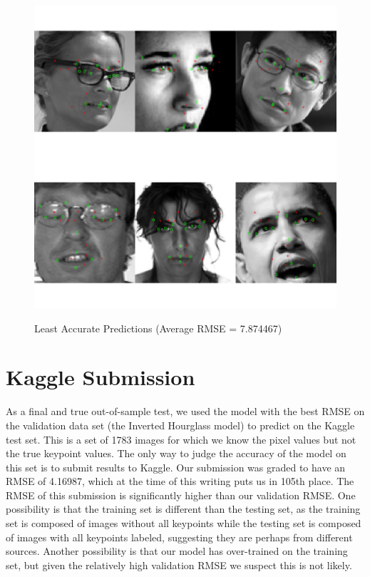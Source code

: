\documentclass[journal]{IEEEtran}
\begin{document}
\begin{figure}[!htb]
  \centering
  \caption{Least Accurate Predictions (Average RMSE = 7.874467)}
  \includegraphics[scale=.49]{worst_faces.pdf}
  \label{fig:worst_faces}
\end{figure}

\section{Kaggle Submission}

As a final and true out-of-sample test, we used the model with the best RMSE on the validation data set (the Inverted Hourglass model) to predict on the Kaggle test set. This is a set of 1783 images for which we know the pixel values but not the true keypoint values. The only way to judge the accuracy of the model on this set is to submit results to Kaggle. Our submission was graded to have an RMSE of 4.16987, which at the time of this writing puts us in 105th place. The RMSE of this submission is significantly higher than our validation RMSE. One possibility is that the training set is different than the testing set, as the training set is composed of images without all keypoints while the testing set is composed of images with all keypoints labeled, suggesting they are perhaps from different sources. Another possibility is that our model has over-trained on the training set, but given the relatively high validation RMSE we suspect this is not likely.



\end{document}
